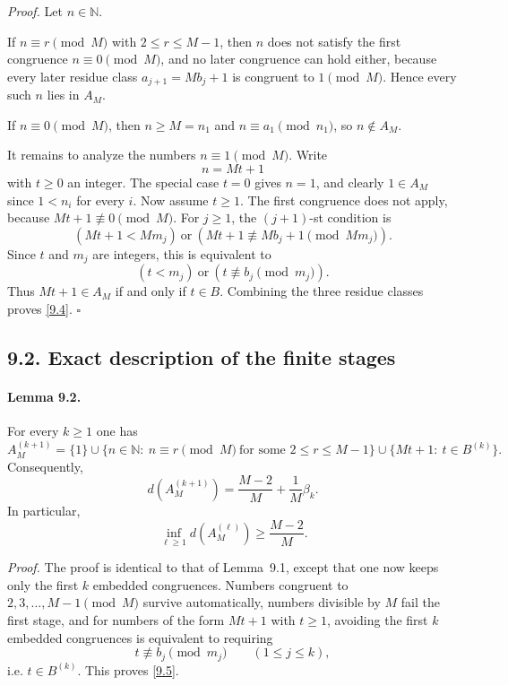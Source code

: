 \emph{Proof.}
Let $n\in\mathbb N$.

If $n\equiv r\pmod M$ with $2\le r\le M-1$, then $n$ does not satisfy the first congruence $n\equiv 0\pmod M$, and no later congruence can hold either, because every later residue class $a_{j+1}=Mb_j+1$ is congruent to $1\pmod M$.  Hence every such $n$ lies in $A_M$.

If $n\equiv 0\pmod M$, then $n\ge M=n_1$ and $n\equiv a_1\pmod{n_1}$, so $n\notin A_M$.

It remains to analyze the numbers $n\equiv 1\pmod M$.  Write
\[
n=Mt+1
\]
with $t\ge 0$ an integer.  The special case $t=0$ gives $n=1$, and clearly $1\in A_M$ since $1<n_i$ for every $i$.
Now assume $t\ge 1$.  The first congruence does not apply, because $Mt+1\not\equiv 0\pmod M$.  For $j\ge 1$, the $(j+1)$-st condition is
\[
(Mt+1<Mm_j)\ \text{or}\ (Mt+1\not\equiv Mb_j+1\pmod{Mm_j}).
\]
Since $t$ and $m_j$ are integers, this is equivalent to
\[
(t<m_j)\ \text{or}\ (t\not\equiv b_j\pmod{m_j}).
\]
Thus $Mt+1\in A_M$ if and only if $t\in B$.
Combining the three residue classes proves \eqref{9.4}. \hfill $\square$

\subsection*{9.2. Exact description of the finite stages}
\paragraph{Lemma 9.2.}
For every $k\ge 1$ one has
\begin{equation}
A_M^{(k+1)}
=
\{1\}
\cup
\{n\in\mathbb N:\ n\equiv r\pmod M\ \text{for some }2\le r\le M-1\}
\cup
\{Mt+1:\ t\in B^{(k)}\}.
\tag{9.5}
\end{equation}
Consequently,
\begin{equation}
 d(A_M^{(k+1)})=\frac{M-2}{M}+\frac1M\beta_k.
\tag{9.6}
\end{equation}
In particular,
\begin{equation}
\inf_{\ell\ge 1} d(A_M^{(\ell)})\ge \frac{M-2}{M}.
\tag{9.7}
\end{equation}

\emph{Proof.}
The proof is identical to that of Lemma~9.1, except that one now keeps only the first $k$ embedded congruences.  Numbers congruent to $2,3,\dots,M-1\pmod M$ survive automatically, numbers divisible by $M$ fail the first stage, and for numbers of the form $Mt+1$ with $t\ge 1$, avoiding the first $k$ embedded congruences is equivalent to requiring
\[
t\not\equiv b_j\pmod{m_j}\qquad (1\le j\le k),
\]
i.e. $t\in B^{(k)}$.  This proves \eqref{9.5}.

